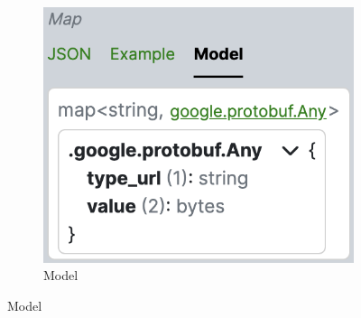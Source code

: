 \begin{figure}[!htb]
\begin{subfigure}{.33\textwidth}
        \includegraphics[width=.95\linewidth]{images/implementation/screenshots/input-map}
        \caption{Model}
    \end{subfigure}


\end{figure}
